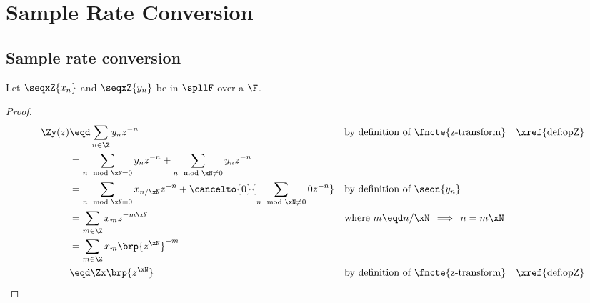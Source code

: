 
\chapter{Sample Rate Conversion}
\label{app:src}


\section{Sample rate conversion}
\begin{theorem}
\label{thm:upsample}
Let $\seqxZ{x_n}$ and $\seqxZ{y_n}$ be   
in $\spllF$  over a  $\F$.
\end{theorem}
\begin{proof}
\begin{align*}
  \Zy(z)
    &\eqd \sum_{n\in\Z} y_n z^{-n}
    &&    \text{by definition of \fncte{z-transform}}
    &&    \text{\xref{def:opZ}}
  \\&=    \sum_{n\mod\xN=0}   y_n z^{-n} +
          \sum_{n\mod\xN\ne0} y_n z^{-n}
  \\&=    \sum_{n\mod\xN=0} x_{n/\xN} z^{-n} +
          \cancelto{0}{\sum_{n\mod \xN\ne 0} 0 z^{-n}}
    &&    \text{by definition of $\seqn{y_n}$}
  \\&=    \sum_{m\in\Z} x_m z^{-m\xN}
    &&    \text{where $m\eqd n/\xN\,\implies\,n=m\xN$}
  \\&=    \sum_{m\in\Z} x_m \brp{z^\xN}^{-m}
  \\&\eqd \Zx\brp{z^\xN}
    &&    \text{by definition of \fncte{z-transform}}
    &&    \text{\xref{def:opZ}}
\end{align*}
\end{proof}



